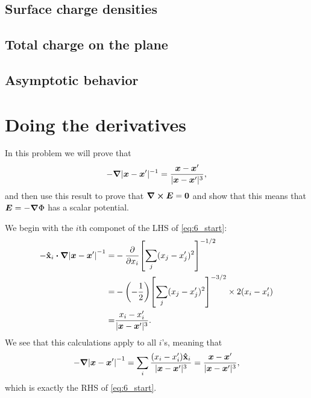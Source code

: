 \documentclass[11pt,letter, swedish, english
]{article}
\begin{document}
\subsection{Surface charge densities}


\subsection{Total charge on the plane}


\subsection{Asymptotic behavior}





\section{Doing the derivatives}
In this problem we will prove that
\begin{equation}\label{eq:6_start}
-\grad|\vb*x-\vb*x'|^{-1}
=\frac{\vb*x-\vb*x'}{|\vb*x-\vb*x'|^{3}},
\end{equation}
and then use this result to prove that $\curl\vb*E=\vb0$ and show that
this means that $\vb*E=-\grad\Phi$ has a scalar potential.

We begin with the $i$th componet of the LHS of \eqref{eq:6_start}:
\begin{equation}
\begin{aligned}
-\vu{x}_i\vdot\grad\qty|\vb*x-\vb*x'|^{-1}
=&-\pdv{x_i}\qty[\sum_j(x_j-x_j')^2]^{-1/2}\\
=&-\qty(-\frac{1}{2})\qty[\sum_j(x_j-x_j')^2]^{-3/2}
\times 2(x_i-x_i')\\
=&\frac{x_i-x_i'}{|\vb*x-\vb*x'|^3}.
\end{aligned}
\end{equation}
We see that this calculations apply to all $i$'s, meaning that
\begin{equation}
-\grad\qty|\vb*x-\vb*x'|^{-1}=
\sum_i\frac{(x_i-x_i')\vu{x}_i}{|\vb*x-\vb*x'|^3}
=\frac{\vb*x-\vb*x'}{|\vb*x-\vb*x'|^{3}},
\end{equation}
which is exactly the RHS of \eqref{eq:6_start}.
\end{document}
